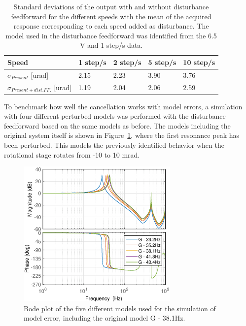 \begin{table}[h!]
  \centering
  \begin{tabular}{| l | l | l | l | l |}
    \hline
      Speed & 1 step/s & 2 step/s & 5 step/s & 10 step/s\\ \hline
      $\sigma_{Present}$ [urad] & 2.15 & 2.23 & 3.90 & 3.76\\
      $\sigma_{Present + dist.FF.}$ [urad] & 1.19 & 2.04 & 2.06 & 2.59\\
    \hline
  \end{tabular}
  \caption{\label{tab:std_diff_speed} Standard deviations of the output with and without disturbance feedforward for the different speeds with the mean of the acquired response corresponding to each speed added as disturbance. The model used in the disturbance feedforward was identified from the 6.5 V and 1 step/s data.}
\end{table}

\FloatBarrier
To benchmark how well the cancellation works with model errors, a simulation with four different perturbed models was performed with the disturbance feedforward based on the same models as before. The models including the original system itself is shown in Figure~\ref{fig:hc_me_bode}, where the first resonance peak has been perturbed. This models the previously identified behavior when the rotational stage rotates from -10 to 10 mrad.

\begin{figure}[h!]
  \centering
  \includegraphics[width=0.7\textwidth]{fig/matlab/bode_rfdc_modelerror.eps}
  \caption{\label{fig:hc_me_bode} Bode plot of the five different models used for the simulation of model error, including the original model G - 38.1Hz.}
\end{figure}

